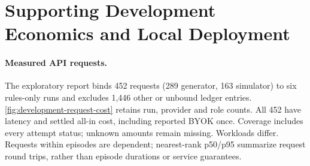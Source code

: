 \section{Supporting Development Economics and Local Deployment}
\label{app:deployment}

\paragraph{Measured API requests.}
The exploratory report binds 452 requests (289 generator, 163 simulator)
to six rules-only runs and excludes 1,446 other or unbound ledger entries.
\autoref{fig:development-request-cost} retains run, provider and role counts.
All 452 have latency and settled all-in cost, including reported BYOK once.
Coverage includes every attempt status; unknown amounts remain missing.
Workloads differ. Requests within episodes are dependent; nearest-rank
p50/p95 summarize request round trips, rather than episode durations or
service guarantees.

